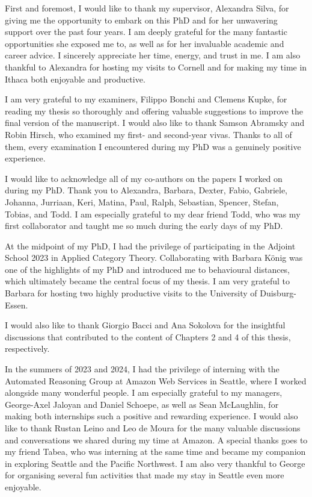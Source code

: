\begin{acknowledgements}
First and foremost, I would like to thank my supervisor, Alexandra Silva, for giving me the opportunity to embark on this PhD and for her unwavering support over the past four years. I am deeply grateful for the many fantastic opportunities she exposed me to, as well as for her invaluable academic and career advice. I sincerely appreciate her time, energy, and trust in me. I am also thankful to Alexandra for hosting my visits to Cornell and for making my time in Ithaca both enjoyable and productive.

I am very grateful to my examiners, Filippo Bonchi and Clemens Kupke, for reading my thesis so thoroughly and offering valuable suggestions to improve the final version of the manuscript. I would also like to thank Samson Abramsky and Robin Hirsch, who examined my first- and second-year vivas. Thanks to all of them, every examination I encountered during my PhD was a genuinely positive experience.

I would like to acknowledge all of my co-authors on the papers I worked on during my PhD. Thank you to Alexandra, Barbara, Dexter, Fabio, Gabriele, Johanna, Jurriaan, Keri, Matina, Paul, Ralph, Sebastian, Spencer, Stefan, Tobias, and Todd. I am especially grateful to my dear friend Todd, who was my first collaborator and taught me so much during the early days of my PhD.

At the midpoint of my PhD, I had the privilege of participating in the Adjoint School 2023 in Applied Category Theory. Collaborating with Barbara König was one of the highlights of my PhD and introduced me to behavioural distances, which ultimately became the central focus of my thesis. I am very grateful to Barbara for hosting two highly productive visits to the University of Duisburg-Essen.

I would also like to thank Giorgio Bacci and Ana Sokolova for the insightful discussions that contributed to the content of Chapters 2 and 4 of this thesis, respectively.

In the summers of 2023 and 2024, I had the privilege of interning with the Automated Reasoning Group at Amazon Web Services in Seattle, where I worked alongside many wonderful people. I am especially grateful to my managers, George-Axel Jaloyan and Daniel Schoepe, as well as Sean McLaughlin, for making both internships such a positive and rewarding experience. I would also like to thank Rustan Leino and Leo de Moura for the many valuable discussions and conversations we shared during my time at Amazon. A special thanks goes to my friend Tabea, who was interning at the same time and became my companion in exploring Seattle and the Pacific Northwest. I am also very thankful to George for organising several fun activities that made my stay in Seattle even more enjoyable.


\end{acknowledgements}
